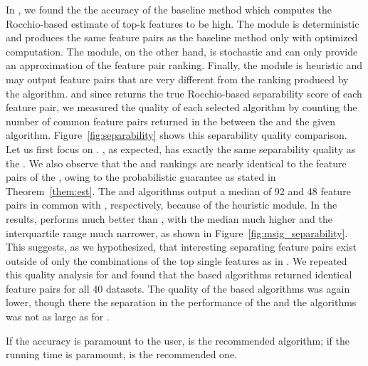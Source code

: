  In \bruterocchioratio, we found the the accuracy of the baseline method which computes the Rocchio-based estimate of top-k features to be high. The \earlyT module is deterministic and produces the same \topk feature pairs as the baseline method only with optimized computation. The \sampling module, on the other hand, is stochastic and can only provide an approximation of the \topk feature pair ranking. Finally, the \traversal module is heuristic and may output \topk feature pairs that are very different from the ranking produced by the \baseline algorithm.
and since \baseline returns the true Rocchio-based separability score of each feature pair, we measured the quality of each selected algorithm by counting the number of common feature pairs returned in the \tophundred between the \baseline and the given algorithm. Figure~\ref{fig:separability} shows this separability quality comparison. Let us first focus on \msig. \earlyOrder, as expected, has exactly the same separability quality as the \baseline. We also observe that the \samp and \sampOpt rankings are nearly identical to the \tophundred feature pairs of the \baseline, owing to the probabilistic guarantee as stated in Theorem~\ref{them:est}. The \horiz and \vertic algorithms output a median of 92 and 48 feature pairs in common with \baseline, respectively, because of the heuristic \traversal module. In the \msig results, \horiz performs much better than \vertic, with the median much higher and the interquartile range much narrower, as shown in Figure~\ref{fig:msig_separability}. This suggests, as we hypothesized, that interesting separating feature pairs exist outside of only the combinations of the top single features as in \vertic. We repeated this quality analysis for \lincs and found that the \sampling based algorithms returned identical \tophundred feature pairs for all 40 datasets. The quality of the \traversal based algorithms was again lower, though there the separation in the performance of the \horiz and the \vertic algorithms was not as large as for \msig.

 If the accuracy is paramount to the user,
\sampOpt is the recommended algorithm; if the running time is paramount, \horiz is the recommended one.


